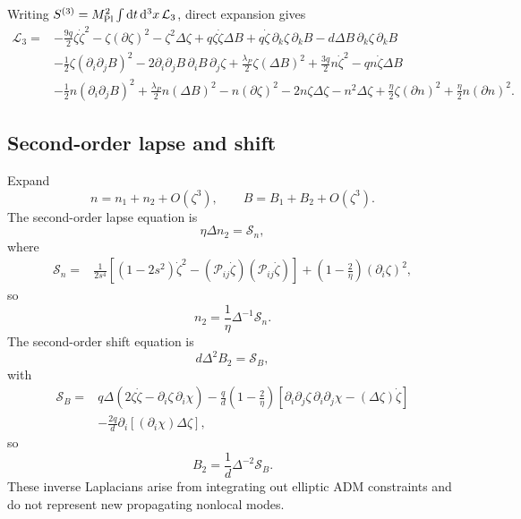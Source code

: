 \documentclass[11pt]{article}
\newcommand{\Mpl}{M_{\rm Pl}}
\newcommand{\dd}{\mathrm{d}}
\newcommand{\Del}{\Delta}
\newcommand{\Pc}{\mathcal P}
\begin{document}
Writing $S^{(3)}=\Mpl^2\int \dd t\,\dd^3x\,\mathcal L_3$, direct expansion gives
\begin{align}
\mathcal L_3={}&
-\frac{9q}{2}\zeta\dot\zeta^2
-\zeta(\partial\zeta)^2-\zeta^2\Del\zeta
+q\zeta\dot\zeta\Del B
+q\dot\zeta\,\partial_k\zeta\,\partial_kB
-d\Del B\,\partial_k\zeta\,\partial_kB
\nonumber\\
&-\frac12\zeta(\partial_i\partial_jB)^2
-2\partial_i\partial_jB\,\partial_iB\,\partial_j\zeta
+\frac{\lambda_P}{2}\zeta(\Del B)^2
+\frac{3q}{2}n\dot\zeta^2-qn\dot\zeta\Del B
\nonumber\\
&-\frac12n(\partial_i\partial_jB)^2
+\frac{\lambda_P}{2}n(\Del B)^2
-n(\partial\zeta)^2-2n\zeta\Del\zeta-n^2\Del\zeta
+\frac{\eta}{2}\zeta(\partial n)^2+\frac{\eta}{2}n(\partial n)^2.
\label{eq:L3}
\end{align}

\subsection{Second-order lapse and shift}

Expand
\begin{equation}
n=n_1+n_2+O(\zeta^3),\qquad B=B_1+B_2+O(\zeta^3).
\end{equation}
The second-order lapse equation is
\begin{equation}
\eta\Del n_2=\mathcal S_n,
\label{eq:n2eq}
\end{equation}
where
\begin{align}
\mathcal S_n={}&\frac{1}{2s^4}
\left[(1-2s^2)\dot\zeta^2-(\Pc_{ij}\dot\zeta)(\Pc_{ij}\dot\zeta)\right]
+\left(1-\frac{2}{\eta}\right)(\partial_i\zeta)^2,
\label{eq:Sn}
\end{align}
so
\begin{equation}
n_2=\frac{1}{\eta}\Del^{-1}\mathcal S_n.
\label{eq:n2sol}
\end{equation}
The second-order shift equation is
\begin{equation}
d\Del^2B_2=\mathcal S_B,
\label{eq:B2eq}
\end{equation}
with
\begin{align}
\mathcal S_B={}&q\Del\left(2\zeta\dot\zeta-\partial_i\zeta\,\partial_i\chi\right)
-\frac{q}{d}\left(1-\frac{2}{\eta}\right)
\left[\partial_i\partial_j\zeta\,\partial_i\partial_j\chi-(\Del\zeta)\dot\zeta\right]
\nonumber\\
&-\frac{2q}{d}\partial_i\left[(\partial_i\chi)\Del\zeta\right],
\label{eq:SB}
\end{align}
so
\begin{equation}
B_2=\frac{1}{d}\Del^{-2}\mathcal S_B.
\label{eq:B2sol}
\end{equation}
These inverse Laplacians arise from integrating out elliptic ADM constraints and do not represent new propagating nonlocal modes.
\end{document}
